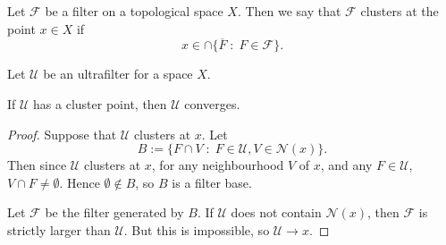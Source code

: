 \begin{definition}
    Let $\mathcal{F}$ be a filter on a topological space $X$. Then we
    say that $\mathcal{F}$ clusters at the point $x \in X$ if
    \begin{equation*}
        x \in \cap\{ \overline{F}\;:\;F \in \mathcal{F}\}.
    \end{equation*}
\end{definition}

\begin{proposition}
\label{clusterImpliesConverge}
    Let $\mathcal{U}$ be an ultrafilter for a space $X$.

    If $\mathcal{U}$ has a cluster point, then $\mathcal{U}$
    converges.
\end{proposition}
\begin{proof}
    Suppose that $\mathcal{U}$
    clusters at $x$. Let
    \begin{equation*}
        B := \{ F\cap V\;:\;F \in\mathcal{U},V \in \mathcal{N}(x)\}.
    \end{equation*}
    Then since $\mathcal{U}$ clusters at $x$, for any neighbourhood $V$
    of $x$, and any $F \in \mathcal{U}$, $V \cap F \neq \emptyset$. Hence $\emptyset \notin B$,
    so $B$ is a filter base.

    Let $\mathcal{F}$ be the filter generated by $B$. If $\mathcal{U}$
    does not contain $\mathcal{N}(x)$, then $\mathcal{F}$ is strictly
    larger than $\mathcal{U}$. But this is impossible, 
    so $\mathcal{U}\rightarrow x$. 
\end{proof}


